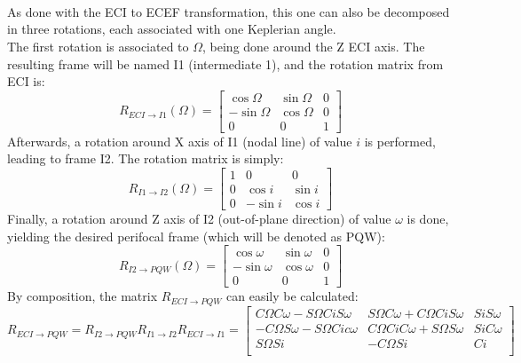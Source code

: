 			\paragraph{  \\}
			\indent As done with the ECI to ECEF transformation, this one can also be decomposed in three rotations, each associated with one Keplerian angle.\\
			\indent The first rotation is associated to $\Omega$, being done around the Z ECI axis. The resulting frame will be named I1 (intermediate 1), and the rotation matrix from ECI is:
			\[
			R_{ECI\rightarrow I1}(\Omega) = \left[
			\begin{array}{ccc}
			\cos \Omega 	& \sin \Omega 	& 0 \\
			- \sin \Omega 	& \cos \Omega 	& 0 \\
			0 				& 0 			& 1 
			\end{array}						
			\right]	
			\]
			\indent Afterwards, a rotation around X axis of I1 (nodal line) of value $i$ is performed, leading to frame I2. The rotation matrix is simply:
			\[
			R_{I1\rightarrow I2}(\Omega) = \left[
			\begin{array}{ccc}
			1 	& 0			 	& 0 \\
			0 	& \cos i 		& \sin i \\
			0 	& -\sin i		& \cos i 
			\end{array}						
			\right]	
			\]
			\indent Finally, a rotation around Z axis of I2 (out-of-plane direction) of value $\omega$ is done, yielding the desired perifocal frame (which will be denoted as PQW):
			\[
			R_{I2\rightarrow PQW}(\Omega) = \left[
			\begin{array}{ccc}
			\cos \omega 	& \sin \omega 	& 0 \\
			- \sin \omega 	& \cos \omega 	& 0 \\
			0 				& 0 			& 1 
			\end{array}						
			\right]	
			\]
			\indent By composition, the matrix $R_{ECI\rightarrow PQW}$ can easily be calculated:
			\[
			R_{ECI \rightarrow PQW} = R_{I2 \rightarrow PQW}R_{I1 \rightarrow I2} R_{ECI \rightarrow I1} = 
			\left[\begin{array}{ccc}
			C \Omega C \omega - S \Omega Ci S\omega 	& S\Omega C\omega + C\Omega Ci S\omega 	& Si S\omega \\
			-C \Omega S \omega - S \Omega Ci c\omega 	& C\Omega Ci C\omega + S\Omega S\omega 	& Si C\omega \\
			S \Omega Si									& - C\Omega Si  						& Ci \\
			\end{array}\right]
			\]
